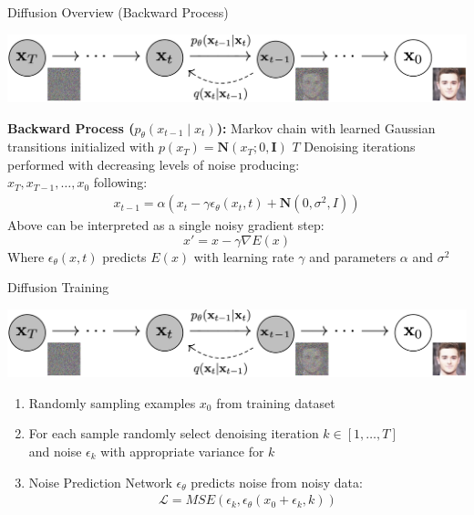 \documentclass{beamer}
\begin{document}
\begin{frame}{Diffusion Overview (Backward Process)}
    \begin{center}
        \includegraphics[width=.9\textwidth]{./img/img_diffusion.png}
    \end{center}
    \textbf{Backward Process ($p_\theta(x_{t-1} \mid x_{t})$):} Markov chain with learned Gaussian \\ \hspace{1em} transitions initialized with $p(x_T) = \mathbf{N}(x_T; 0, \mathbf{I})$ \newline \newline
    $T$ Denoising iterations performed with decreasing levels of noise producing: \\ \hspace{1em} $x_T, x_{T-1}, \dots, x_0$ following:
    \begin{gather}
    x_{t-1} = \alpha(x_t - \gamma \epsilon_\theta(x_t, t) + \textbf{N}(0, \sigma^2, I))\label{eq:1}
    \end{gather}
    Above can be interpreted as a single noisy gradient step:
    \[
    x' = x - \gamma \nabla E(x)
    \]
    Where $\epsilon_\theta(x, t)$ predicts $E(x)$ with learning rate $\gamma$ and parameters $\alpha$ and $\sigma^2$
\end{frame}

\begin{frame}[t]{Diffusion Training}
    \begin{center}
        \includegraphics[width=.9\textwidth]{./img/img_diffusion.png}
    \end{center}
    \begin{enumerate}[label=\arabic*.]
        \item Randomly sampling examples $x_0$ from training dataset \pause
        \item For each sample randomly select denoising iteration $k \in [1, \dots, T]$ \\ \hspace{1em} and noise $\epsilon_k$ with appropriate variance for $k$ \pause
        \item  Noise Prediction Network $\epsilon_\theta$ predicts noise from noisy data:
        \begin{gather}\label{eq:2}
            \mathcal{L} = MSE(\epsilon_k, \epsilon_\theta(x_0 + \epsilon_k, k))
        \end{gather}
    \end{enumerate}
\end{frame}
\end{document}
